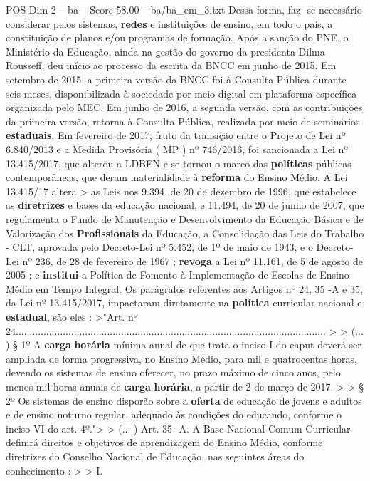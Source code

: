 \begin{textsample}{POS Dim 2 – ba – Score 58.00 – ba/ba\_em\_3.txt}
Dessa forma, faz -se necessário considerar pelos sistemas, \textbf{redes} e instituições de ensino, em todo o país, a constituição de planos e/ou programas de formação.
Após a sanção do PNE, o Ministério da Educação, ainda na gestão do governo da presidenta Dilma Rousseff, deu início ao processo da escrita da BNCC em junho de 2015.
Em setembro de 2015, a primeira versão da BNCC foi à Consulta Pública durante seis meses, disponibilizada à sociedade por meio digital em plataforma específica organizada pelo MEC.
Em junho de 2016, a segunda versão, com as contribuições da primeira versão, retorna à Consulta Pública, realizada por meio de seminários \textbf{estaduais}.
Em fevereiro de 2017, fruto da transição entre o Projeto de Lei nº 6.840/2013 e a Medida Provisória ( MP ) nº 746/2016, foi sancionada a Lei nº 13.415/2017, que alterou a LDBEN e se tornou o marco das \textbf{políticas} públicas contemporâneas, que deram materialidade à \textbf{reforma} do Ensino Médio.
A Lei 13.415/17 altera > as Leis nos 9.394, de 20 de dezembro de 1996, que estabelece as \textbf{diretrizes} e bases da educação nacional, e 11.494, de 20 de junho de 2007, que regulamenta o Fundo de Manutenção e Desenvolvimento da Educação Básica e de Valorização dos \textbf{Profissionais} da Educação, a Consolidação das Leis do Trabalho - CLT, aprovada pelo Decreto-Lei nº 5.452, de 1º de maio de 1943, e o Decreto-Lei nº 236, de 28 de fevereiro de 1967 ; \textbf{revoga} a Lei nº 11.161, de 5 de agosto de 2005 ; e \textbf{institui} a Política de Fomento à Implementação de Escolas de Ensino Médio em Tempo Integral.
Os parágrafos referentes aos Artigos nº 24, 35 -A e 35, da Lei nº 13.415/2017, impactaram diretamente na \textbf{política} curricular nacional e \textbf{estadual}, são eles : >"Art. nº 24................................................................................................................ > > (... ) § 1º A \textbf{carga} \textbf{horária} mínima anual de que trata o inciso I do caput deverá ser ampliada de forma progressiva, no Ensino Médio, para mil e quatrocentas horas, devendo os sistemas de ensino oferecer, no prazo máximo de cinco anos, pelo menos mil horas anuais de \textbf{carga} \textbf{horária}, a partir de 2 de março de 2017. > > § 2º Os sistemas de ensino disporão sobre a \textbf{oferta} de educação de jovens e adultos e de ensino noturno regular, adequado às condições do educando, conforme o inciso VI do art. 4º."> > (... ) Art. 35 -A.
A Base Nacional Comum Curricular definirá direitos e objetivos de aprendizagem do Ensino Médio, conforme diretrizes do Conselho Nacional de Educação, nas seguintes áreas do conhecimento : > > I.

\end{textsample}

